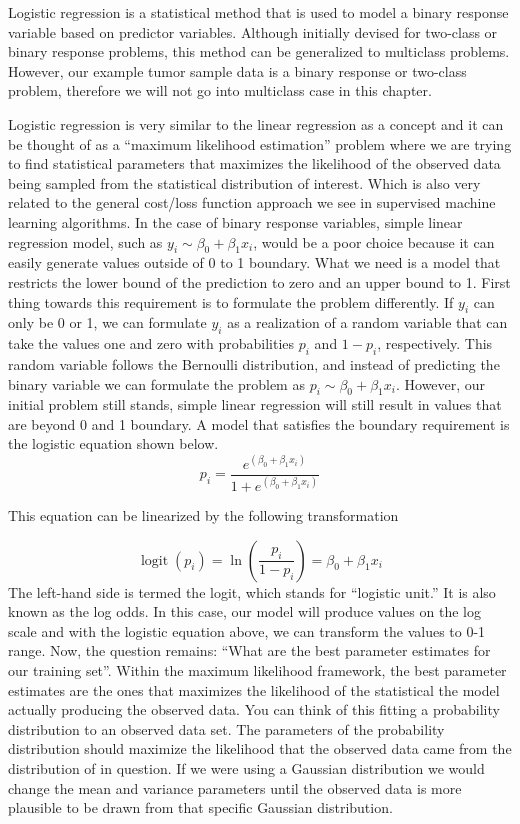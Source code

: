 \documentclass[12pt,]{krantz}
\begin{document}
Logistic regression is a statistical method that is used to model a binary response variable based on predictor variables. Although initially devised for two-class or binary response problems, this method can be generalized to multiclass problems. However, our example tumor sample data is a binary response or two-class problem, therefore we will not go into multiclass case in this chapter.

Logistic regression is very similar to the linear regression as a concept and it can be thought of as a ``maximum likelihood estimation'' problem where we are trying to find statistical parameters that maximizes the likelihood of the observed data being sampled from the statistical distribution of interest. Which is also very related to the general cost/loss function approach we see in supervised machine learning algorithms. In the case of binary response variables, simple linear regression model, such as \(y_i \sim \beta _{0}+\beta _{1}x_i\), would be a poor choice because it can easily generate values outside of 0 to 1 boundary. What we need is a
model that restricts the lower bound of the prediction to zero and an upper
bound to 1. First thing towards this requirement is to formulate the problem differently. If \(y_i\) can only be 0 or 1, we can formulate \(y_i\) as a realization of a random variable that can take the values one and zero with probabilities \(p_i\) and \(1-{p_i}\), respectively. This random variable follows the Bernoulli distribution, and instead of predicting the binary variable we can formulate the problem as \(p_i \sim \beta _{0}+\beta _{1}x_i\). However, our initial problem still stands, simple linear regression will still result in values that are beyond 0 and 1 boundary. A model that satisfies the boundary requirement is the logistic equation shown below.
\[
{\displaystyle p_i={\frac {e^{(\beta _{0}+\beta _{1}x_i)}}{1+e^{(\beta _{0}+\beta_{1}x_i)}}}}
\]

This equation can be linearized by the following transformation

\[
{\displaystyle \operatorname{logit} (p_i)=\ln \left({\frac {p_i}{1-p_i}}\right)=\beta _{0}+\beta _{1}x_i}
\]
The left-hand side is termed the logit, which stands for ``logistic unit.'' It is also known as the log odds. In this case, our model will produce values on the log scale and with the logistic equation above, we can transform the values to 0-1 range. Now, the question remains: ``What are the best parameter estimates for our training set''. Within the maximum likelihood framework, the best parameter estimates are the ones that maximizes the likelihood of the statistical the model actually producing the observed data. You can think of this fitting a probability distribution to an observed data set. The parameters of the probability distribution should maximize the likelihood that the observed data came from the distribution of in question. If we were using a Gaussian distribution we would change the mean and variance parameters until the observed data is more plausible to be drawn from that specific Gaussian distribution.
\end{document}
